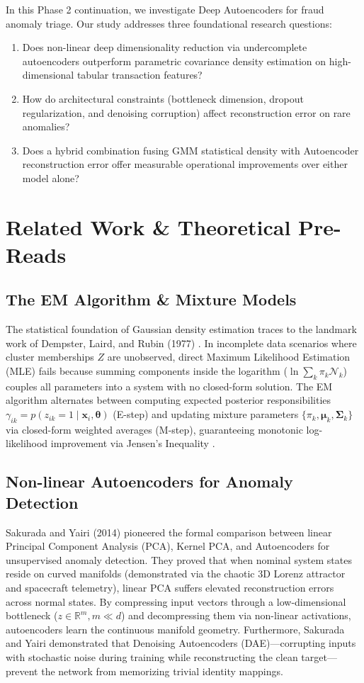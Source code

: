 \documentclass[10pt,journal,compsoc]{IEEEtran}
\begin{document}
In this Phase 2 continuation, we investigate Deep Autoencoders for fraud anomaly triage. Our study addresses three foundational research questions:
\begin{enumerate}
    \item Does non-linear deep dimensionality reduction via undercomplete autoencoders outperform parametric covariance density estimation on high-dimensional tabular transaction features?
    \item How do architectural constraints (bottleneck dimension, dropout regularization, and denoising corruption) affect reconstruction error on rare anomalies?
    \item Does a hybrid combination fusing GMM statistical density with Autoencoder reconstruction error offer measurable operational improvements over either model alone?
\end{enumerate}

\section{Related Work \& Theoretical Pre-Reads}
\subsection{The EM Algorithm \& Mixture Models}
The statistical foundation of Gaussian density estimation traces to the landmark work of Dempster, Laird, and Rubin (1977) \cite{dempster1977maximum}. In incomplete data scenarios where cluster memberships $Z$ are unobserved, direct Maximum Likelihood Estimation (MLE) fails because summing components inside the logarithm ($\ln \sum_k \pi_k \mathcal{N}_k$) couples all parameters into a system with no closed-form solution. The EM algorithm alternates between computing expected posterior responsibilities $\gamma_{ik} = p(z_{ik}=1 \mid \mathbf{x}_i, \boldsymbol{\theta})$ (E-step) and updating mixture parameters $\{\pi_k, \boldsymbol{\mu}_k, \boldsymbol{\Sigma}_k\}$ via closed-form weighted averages (M-step), guaranteeing monotonic log-likelihood improvement via Jensen's Inequality \cite{bishop2006pattern}.

\subsection{Non-linear Autoencoders for Anomaly Detection}
Sakurada and Yairi (2014) \cite{sakurada2014anomaly} pioneered the formal comparison between linear Principal Component Analysis (PCA), Kernel PCA, and Autoencoders for unsupervised anomaly detection. They proved that when nominal system states reside on curved manifolds (demonstrated via the chaotic 3D Lorenz attractor and spacecraft telemetry), linear PCA suffers elevated reconstruction errors across normal states. By compressing input vectors through a low-dimensional bottleneck ($z \in \mathbb{R}^m, m \ll d$) and decompressing them via non-linear activations, autoencoders learn the continuous manifold geometry. Furthermore, Sakurada and Yairi demonstrated that Denoising Autoencoders (DAE)---corrupting inputs with stochastic noise during training while reconstructing the clean target---prevent the network from memorizing trivial identity mappings.
\end{document}
